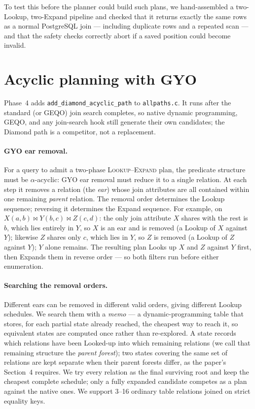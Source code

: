 \documentclass[10pt,twocolumn]{article}
\newcommand{\lookup}{\textsc{Lookup}}
\newcommand{\expand}{\textsc{Expand}}
\newcommand{\code}[1]{{\small\texttt{#1}}}
\begin{document}
To test this before the planner could build such plans, we hand-assembled a
two-Lookup, two-Expand pipeline and checked that it returns exactly the same rows
as a normal PostgreSQL join --- including duplicate rows and a repeated scan ---
and that the safety checks correctly abort if a saved position could become
invalid.

\section{Acyclic planning with GYO}

Phase~4 adds \code{add\_diamond\_acyclic\_path} to \code{allpaths.c}. It runs
after the standard (or GEQO) join search completes, so native dynamic
programming, GEQO, and any join-search hook still generate their own candidates;
the Diamond path is a competitor, not a replacement.

\paragraph{GYO ear removal.}
For a query to admit a two-phase \lookup{}--\expand{} plan, the predicate
structure must be $\alpha$-acyclic: GYO ear removal must reduce it to a single
relation. At each step it removes a relation (the \emph{ear}) whose join
attributes are all contained within one remaining \emph{parent} relation.
The removal order determines the Lookup sequence; reversing it determines the
Expand sequence. For example, on $X(a,b)\bowtie Y(b,c)\bowtie Z(c,d)$: the only
join attribute $X$ shares with the rest is $b$, which lies entirely in $Y$, so
$X$ is an ear and is removed (a Lookup of $X$ against $Y$); likewise $Z$ shares
only $c$, which lies in $Y$, so $Z$ is removed (a Lookup of $Z$ against $Y$);
$Y$ alone remains. The resulting plan Looks up $X$ and $Z$ against $Y$ first,
then Expands them in reverse order --- so both filters run before either
enumeration.

\paragraph{Searching the removal orders.}
Different ears can be removed in different valid orders, giving different Lookup
schedules. We search them with a \emph{memo} --- a dynamic-programming table that
stores, for each partial state already reached, the cheapest way to reach it, so
equivalent states are computed once rather than re-explored. A state records
which relations have been Looked-up into which remaining relations (we call that
remaining structure the \emph{parent forest}); two states covering the same set
of relations are kept separate when their parent forests differ, as the paper's
Section~4 requires. We try every relation as the final surviving root and keep
the cheapest complete schedule; only a fully expanded candidate competes as a
plan against the native ones. We support 3--16 ordinary table relations joined
on strict equality keys.
\end{document}
